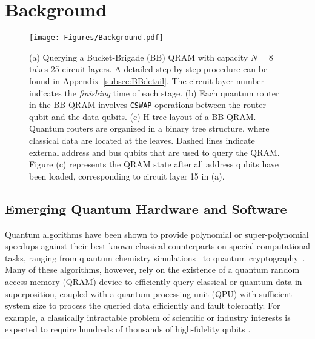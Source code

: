 \section{Background}\label{sec:background}
\begin{figure*}[t]
    \centering
    \texttt{[image: Figures/Background.pdf]}
    \caption{(a) Querying a Bucket-Brigade (BB) QRAM with capacity $N=8$ takes 25 circuit layers. A detailed step-by-step procedure can be found in Appendix~\ref{subsec:BBdetail}. The circuit layer number indicates the \emph{finishing} time of each stage. (b) Each quantum router in the BB QRAM involves \texttt{CSWAP} operations between the router qubit and the data qubits. (c) H-tree layout of a BB QRAM. Quantum routers are organized in a binary tree structure, where classical data are located at the leaves. Dashed lines indicate external address and bus qubits that are used to query the QRAM. Figure (c) represents the QRAM state after all address qubits have been loaded, corresponding to circuit layer 15 in (a).} 
    \label{fig:bg}
\end{figure*}

\subsection{Emerging Quantum Hardware and Software} 

Quantum algorithms have been shown to provide polynomial or super-polynomial speedups against their best-known classical counterparts on special computational tasks, ranging from quantum chemistry simulations~\cite{lee2021even, berry2019qubitization, van2020convex} to quantum cryptography~\cite{gidney2021factor, shor1994algorithms}. Many of these algorithms, however, rely on the existence of a quantum random access memory (QRAM) device to efficiently query classical or quantum data in superposition, coupled with a quantum processing unit (QPU) with sufficient system size to process the queried data efficiently and fault tolerantly. For example, a classically intractable problem of scientific or industry interests is expected to require hundreds of thousands of high-fidelity qubits \cite{gidney2021factor, beverland2022assessing}.

